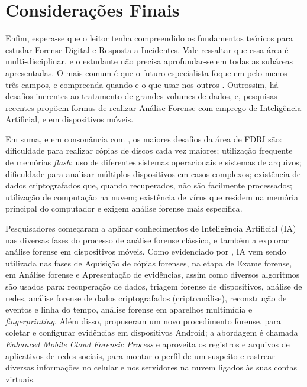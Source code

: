 \section{Considerações Finais}
    
    \vspace{10.5cm}

    \hspace{1cm}
    Enfim, espera-se que o leitor tenha compreendido os fundamentos teóricos para estudar Forense Digital e Resposta a Incidentes. Vale ressaltar que essa área é multi-disciplinar, e o estudante não precisa aprofundar-se em todas as subáreas apresentadas. O mais comum é que o futuro especialista foque em pelo menos três campos, e compreenda quando e o que usar nos outros \cite{roberts2016}. Outrossim, há desafios inerentes ao tratamento de grandes volumes de dados, e, pesquisas recentes propõem formas de realizar Análise Forense com emprego de Inteligência Artificial, e em dispositivos móveis.

    \vspace{4mm}

    \hspace{1cm}
    Em suma, e em consonância com , os maiores desafios da área de FDRI são: dificuldade para realizar cópias de discos cada vez maiores; utilização frequente de memórias \textit{flash}; uso de diferentes sistemas operacionais e sistemas de arquivos; dificuldade para analisar múltiplos dispositivos em casos complexos; existência de dados criptografados que, quando recuperados, não são facilmente processados; utilização de computação na nuvem; existência de vírus que residem na memória principal do computador e exigem análise forense mais específica.

    \vspace{4mm}

    \hspace{1cm}
    Pesquisadores começaram a aplicar conhecimentos de Inteligência Artificial (IA) nas diversas fases do processo de análise forense clássico, e também a explorar análise forense em dispositivos móveis. Como evidenciado por , IA vem sendo utilizada nas fases de Aquisição de cópias forenses, na etapa de Exame forense, em Análise forense e Apresentação de evidências, assim como diversos algoritmos são usados para: recuperação de dados, triagem forense de dispositivos, análise de redes, análise forense de dados criptografados (criptoanálise), reconstrução de eventos e linha do tempo, análise forense em aparelhos multimídia e \textit{fingerprinting}. Além disso,  propuseram um novo procedimento forense, para coletar e configurar evidências em dispositivos Android; a abordagem é chamada \textit{Enhanced Mobile Cloud Forensic Process} e aproveita os registros e arquivos de aplicativos de redes sociais, para montar o perfil de um suspeito e rastrear diversas informações no celular e nos servidores na nuvem ligados às suas contas virtuais.

\newpage